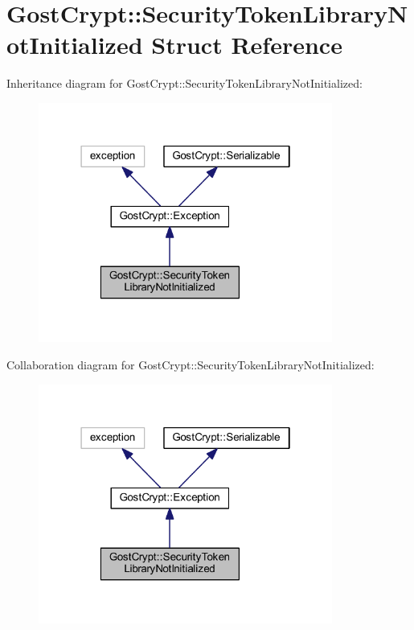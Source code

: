 \hypertarget{struct_gost_crypt_1_1_security_token_library_not_initialized}{}\section{Gost\+Crypt\+:\+:Security\+Token\+Library\+Not\+Initialized Struct Reference}
\label{struct_gost_crypt_1_1_security_token_library_not_initialized}


Inheritance diagram for Gost\+Crypt\+:\+:Security\+Token\+Library\+Not\+Initialized\+:
\nopagebreak
\begin{figure}[H]
\begin{center}
\leavevmode
\includegraphics[width=274pt]{struct_gost_crypt_1_1_security_token_library_not_initialized__inherit__graph}
\end{center}
\end{figure}


Collaboration diagram for Gost\+Crypt\+:\+:Security\+Token\+Library\+Not\+Initialized\+:
\nopagebreak
\begin{figure}[H]
\begin{center}
\leavevmode
\includegraphics[width=274pt]{struct_gost_crypt_1_1_security_token_library_not_initialized__coll__graph}
\end{center}
\end{figure}
